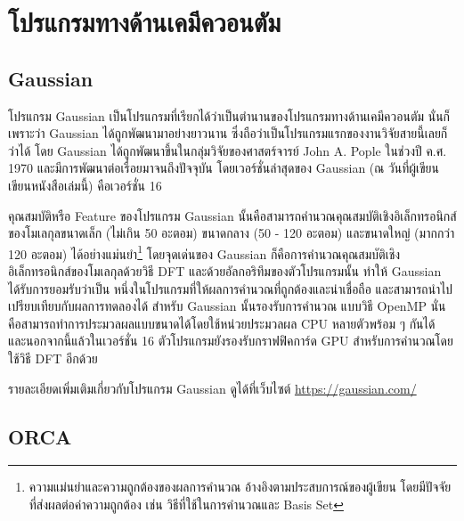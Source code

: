 

\section{โปรแกรมทางด้านเคมีควอนตัม}
\label{ap:qm_software}

\subsection{Gaussian}
\label{ssec:software_gaussian}

โปรแกรม Gaussian เป็นโปรแกรมที่เรียกได้ว่าเป็นตำนานของโปรแกรมทางด้านเคมีควอนตัม นั่นก็เพราะว่า Gaussian ได้ถูกพัฒนามาอย่างยาวนาน 
ซึ่งถือว่าเป็นโปรแกรมแรกของงานวิจัยสายนี้เลยก็ว่าได้ โดย Gaussian ได้ถูกพัฒนาขึ้นในกลุ่มวิจัยของศาสตร์จารย์ John A. Pople ในช่วงปี ค.ศ.
1970 และมีการพัฒนาต่อเรื่อยมาจนถึงปัจจุบัน โดยเวอร์ชั่นล่าสุดของ Gaussian (ณ วันที่ผู้เขียนเขียนหนังสือเล่มนี้) คือเวอร์ชั่น 16\autocite{g16}

คุณสมบัติหรือ Feature ของโปรแกรม Gaussian นั้นคือสามารถคำนวณคุณสมบัติเชิงอิเล็กทรอนิกส์ของโมเลกุลขนาดเล็ก (ไม่เกิน 50 อะตอม) 
ขนาดกลาง (50 - 120 อะตอม) และขนาดใหญ่ (มากกว่า 120 อะตอม) ได้อย่างแม่นยำ\footnote{ความแม่นยำและความถูกต้องของผลการคำนวณ%
อ้างอิงตามประสบการณ์ของผู้เขียน โดยมีปัจจัยที่ส่งผลต่อค่าความถูกต้อง เช่น วิธีที่ใช้ในการคำนวณและ Basis Set} โดยจุดเด่นของ Gaussian 
ก็คือการคำนวณคุณสมบัติเชิงอิเล็กทรอนิกส์ของโมเลกุลด้วยวิธี DFT และด้วยอัลกอริทึมของตัวโปรแกรมนั้น ทำให้ Gaussian ได้รับการยอมรับว่าเป็น%
หนึ่งในโปรแกรมที่ให้ผลการคำนวณที่ถูกต้องและน่าเชื่อถือ และสามารถนำไปเปรียบเทียบกับผลการทดลองได้ สำหรับ Gaussian นั้นรองรับการคำนวณ%
แบบวิธี OpenMP นั่นคือสามารถทำการประมวลผลแบบขนาดได้โดยใช้หน่วยประมวลผล CPU หลายตัวพร้อม ๆ กันได้ และนอกจากนี้แล้วในเวอร์ชั่น 16
ตัวโปรแกรมยังรองรับกราฟฟิคการ์ด GPU สำหรับการคำนวณโดยใช้วิธี DFT อีกด้วย 

รายละเอียดเพิ่มเติมเกี่ยวกับโปรแกรม Gaussian ดูได้ที่เว็บไซต์ \url{https://gaussian.com/}

\subsection{ORCA}
\label{ssec:orca}

